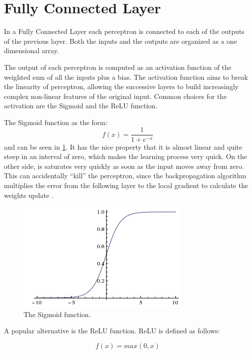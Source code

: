 \section{Fully Connected Layer}
\label{sec:fc_layer}

In a Fully Connected Layer each perceptron is connected to each of the outputs of the previous layer.
Both the inputs and the outputs are organized as a one dimensional array.

The output of each perceptron is computed as an activation function of the weighted sum of all the inputs plus a bias.
The activation function aims to break the linearity of perceptron, allowing the successive layers to build increasingly complex non-linear features of the original input.
Common choices for the activation are the Sigmoid and the \ac{ReLU} function.

The Sigmoid function as the form:
\begin{equation*}
    f(x) = \frac{1}{1 + e^{-x}}
\end{equation*}
and can be seen in \cref{fig:sigmoid}.
It has the nice property that it is almost linear and quite steep in an interval of zero, which makes the learning process very quick.
On the other side, is saturates very quickly as soon as the input moves away from zero.
This can accidentally ``kill'' the perceptron, since the backpropagation algorithm multiplies the error from the following layer to the local gradient to calculate the weights update \cite{CS231n}.

\begin{figure}[ht]
	\centering
	\includegraphics[scale=0.6]{figures/sigmoid}
	\caption{The Sigmoid function.}
	\label{fig:sigmoid}
\end{figure}

A popular alternative is the \ac{ReLU} function.
\ac{ReLU} is defined as follows:

\begin{equation*}
    f(x) = max(0, x)
\end{equation*}

